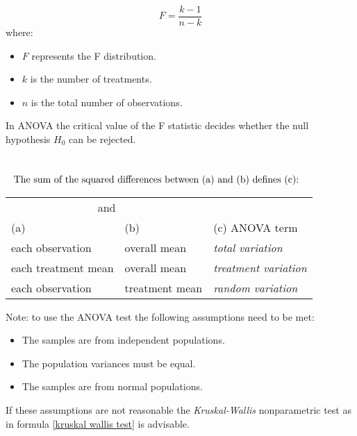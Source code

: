 \begin{equation}
\label{critical value for f statistic}
F = \frac{k-1}{n-k}
\end{equation}
where:
\begin{itemize}
 \item $F$ represents the F distribution.
 \item $k$ is the number of treatments.
 \item $n$ is the total number of observations.
\end{itemize}
In ANOVA the critical value of the F statistic decides whether the null hypothesis $H_{0}$ can be rejected. 
\hformbar


 \\
\begin{equation}
\label{anova components}
\vbox{\noindent The sum of the squared differences between (a) and (b) defines (c):}
\end{equation}
\begin{table}[!h] %
  \begin{scriptsize} %
  \begin{tabular}{lll}  
  \toprule
  \multicolumn{2}{c}{and} \\
  \cmidrule(r){1-2}
  (a)    &(b)    &(c) ANOVA term\\
  \midrule
  each observation     & overall mean    & \textit{total variation}  \\
  each treatment mean  & overall mean    & \textit{treatment variation} \\
  each observation     & treatment mean  & \textit{random variation} \\
  \bottomrule
  \end{tabular}
  \end{scriptsize}
\end{table}
\newline
Note: to use the ANOVA test the following assumptions need to be met:
\begin{itemize}
 \item The samples are from independent populations.
 \item The population variances must be equal.
 \item The samples are from normal populations.
\end{itemize}
If these assumptions are not reasonable the \textit{Kruskal-Wallis} nonparametric test as in formula \eqref{kruskal wallis test} is advisable.

